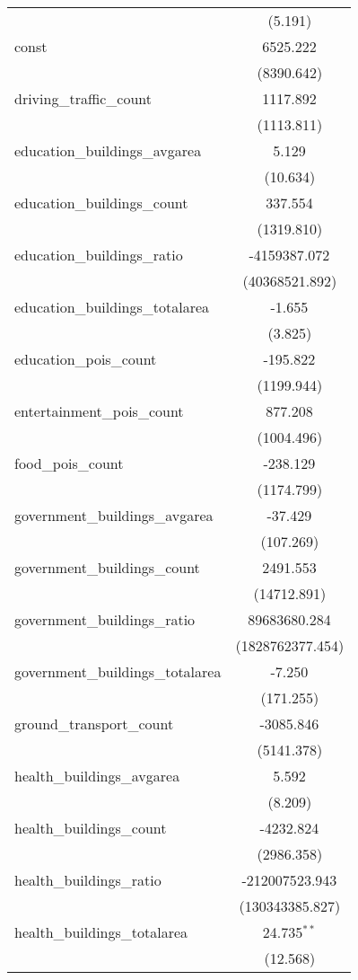 \begin{table}[!htbp]
\begin{tabular}{@{\extracolsep{5pt}}lc}
  & (5.191) \\
 const & 6525.222$^{}$ \\
  & (8390.642) \\
 driving_traffic_count & 1117.892$^{}$ \\
  & (1113.811) \\
 education_buildings_avgarea & 5.129$^{}$ \\
  & (10.634) \\
 education_buildings_count & 337.554$^{}$ \\
  & (1319.810) \\
 education_buildings_ratio & -4159387.072$^{}$ \\
  & (40368521.892) \\
 education_buildings_totalarea & -1.655$^{}$ \\
  & (3.825) \\
 education_pois_count & -195.822$^{}$ \\
  & (1199.944) \\
 entertainment_pois_count & 877.208$^{}$ \\
  & (1004.496) \\
 food_pois_count & -238.129$^{}$ \\
  & (1174.799) \\
 government_buildings_avgarea & -37.429$^{}$ \\
  & (107.269) \\
 government_buildings_count & 2491.553$^{}$ \\
  & (14712.891) \\
 government_buildings_ratio & 89683680.284$^{}$ \\
  & (1828762377.454) \\
 government_buildings_totalarea & -7.250$^{}$ \\
  & (171.255) \\
 ground_transport_count & -3085.846$^{}$ \\
  & (5141.378) \\
 health_buildings_avgarea & 5.592$^{}$ \\
  & (8.209) \\
 health_buildings_count & -4232.824$^{}$ \\
  & (2986.358) \\
 health_buildings_ratio & -212007523.943$^{}$ \\
  & (130343385.827) \\
 health_buildings_totalarea & 24.735$^{**}$ \\
  & (12.568) \\

\end{tabular}
\end{table}
